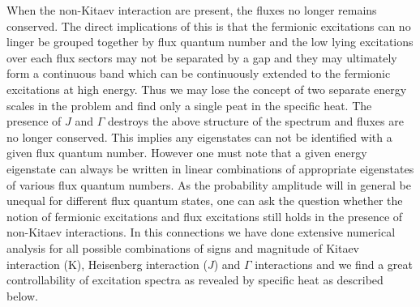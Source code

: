 \documentclass[aps,amsmath,twocolumn,amssymb,floatfix,showpacs,superscriptaddress,nofootinbib,longbibliography]{revtex4-1}
\begin{document}
When the non-Kitaev interaction are present, the fluxes no longer remains conserved. The direct implications of this is that the fermionic excitations can no linger be grouped together by flux quantum number and the low lying excitations over each flux sectors may not be separated by a gap and they may ultimately form a continuous band which can be continuously extended to the fermionic excitations at high energy. Thus we may lose the concept of two separate energy scales in the problem and find only a single peat in the specific heat. The presence of $J$ and $\Gamma$ destroys the above structure of the spectrum and fluxes are no longer conserved. This implies  any eigenstates can not be identified with a given flux quantum number. However one must note that a given energy eigenstate  can always be written in linear combinations of appropriate eigenstates of various flux quantum numbers. As the probability amplitude will in general be unequal for different flux quantum states, one can ask the question whether the notion of fermionic excitations and flux excitations still holds in the presence of non-Kitaev interactions. In this connections we have done extensive numerical analysis for all possible combinations of signs and magnitude of Kitaev interaction (K), Heisenberg interaction ($J$) and $\Gamma$ interactions and we find a great controllability of excitation spectra as revealed by specific heat as described below. \\
\end{document}
